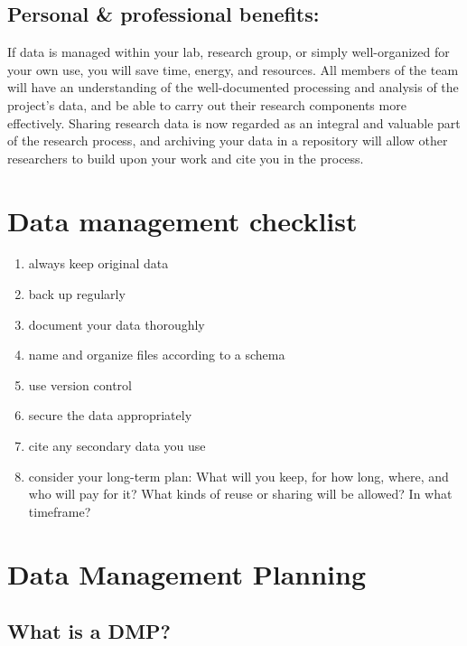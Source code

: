 \subsection{Personal \& professional
benefits:}\label{personal-professional-benefits}

If data is managed within your lab, research group, or simply
well-organized for your own use, you will save time, energy, and
resources. All members of the team will have an understanding of the
well-documented processing and analysis of the project's data, and be
able to carry out their research components more effectively. Sharing
research data is now regarded as an integral and valuable part of the
research process, and archiving your data in a repository will allow
other researchers to build upon your work and cite you in the process.

\section{Data management checklist}\label{data-management-checklist}

\begin{enumerate}
\def\labelenumi{\arabic{enumi}.}
\tightlist
\item
  always keep original data
\item
  back up regularly\\
\item
  document your data thoroughly
\item
  name and organize files according to a schema
\item
  use version control
\item
  secure the data appropriately
\item
  cite any secondary data you use
\item
  consider your long-term plan: What will you keep, for how long, where,
  and who will pay for it? What kinds of reuse or sharing will be
  allowed? In what timeframe?
\end{enumerate}

\section{Data Management Planning}\label{data-management-planning}

\subsection{What is a DMP?}\label{what-is-a-dmp}

